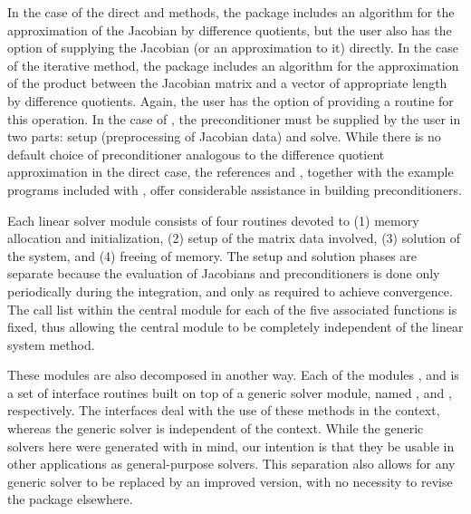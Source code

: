 In the case of the direct {\cvdense} and {\cvband} methods, the package includes
an algorithm for the approximation of the Jacobian by difference
quotients, but the user also has the option of supplying the Jacobian
(or an approximation to it) directly. In the case of the iterative
{\cvspgmr} method, the package includes an algorithm for the approximation
of the product between the Jacobian matrix and a vector of appropriate length
by difference quotients. Again, the user has the option of providing
a routine for this operation.
In  the case of {\cvspgmr}, 
the preconditioner must be supplied by the user in two parts: 
setup (preprocessing of Jacobian data) and solve.
While there is no default
choice of preconditioner analogous to the difference quotient
approximation in the direct case, the references
\cite{BrHi:89} and \cite{Byr:92}, together with
the example programs included with {\cvodes}, offer
considerable assistance in building preconditioners.

Each {\cvodes} linear solver module consists of four routines devoted to (1)
memory allocation and initialization, (2) setup of the matrix data
involved, (3) solution of the system, and (4) freeing of memory.  
The setup and solution phases are separate because the evaluation of
Jacobians and preconditioners is done only periodically during the
integration, and only as required to achieve convergence. The call list within
the central {\cvodes} module for each of the five associated functions is
fixed, thus allowing the central module to be completely independent
of the linear system method.

These modules are also decomposed in another way.
Each of the modules {\cvdense}, {\cvband} and {\cvspgmr} is a set of 
interface routines built on top of a generic solver module, 
named {\dense}, {\band} and {\spgmr}, respectively.  
The interfaces deal with the use of these methods in the {\cvodes} context, 
whereas the generic solver is independent of the context.
While the generic solvers here were generated with {\sundials} in mind, our
intention is that they be usable in other applications as
general-purpose solvers.  This separation also allows for any generic
solver to be replaced by an improved version, with no necessity to
revise the {\cvodes} package elsewhere.

